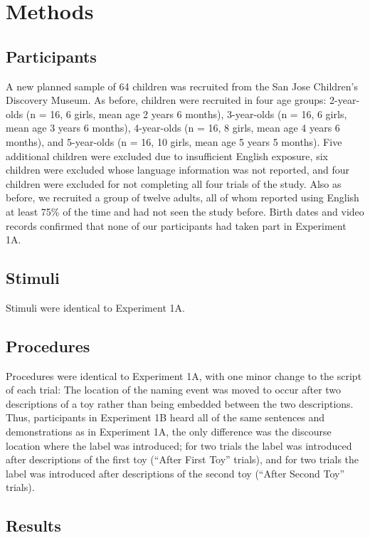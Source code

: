 \documentclass[man]{apa2}
\begin{document}
\section{Methods}

\subsection{Participants}

A new planned sample of 64 children was recruited from the San Jose Children's Discovery Museum. As before, children were recruited in four age groups: 2-year-olds (n = 16, 6 girls, mean age 2 years 6 months), 3-year-olds  (n = 16, 6 girls, mean age 3 years 6 months), 4-year-olds (n = 16, 8 girls, mean age 4 years 6 months), and 5-year-olds (n = 16, 10 girls, mean age 5 years 5 months).  Five additional children were excluded due to insufficient English exposure, six children were excluded whose language information was not reported, and four children were excluded for not completing all four trials of the study.  Also as before, we recruited a group of twelve adults, all of whom reported using English at least 75\% of the time and had not seen the study before.  Birth dates and video records confirmed that none of our participants had taken part in Experiment 1A. 

\subsection{Stimuli}

Stimuli were identical to Experiment 1A. 

\subsection{Procedures}

Procedures were identical to Experiment 1A, with one minor change to the script of each trial: The location of the naming event was moved to occur after two descriptions of a toy rather than being embedded between the two descriptions. Thus, participants in Experiment 1B heard all of the same sentences and demonstrations as in Experiment 1A, the only difference was the discourse location where the label was introduced; for two trials the label was introduced after descriptions of the first toy (``After First Toy'' trials), and for two trials the label was introduced after descriptions of the second toy (``After Second Toy'' trials).  

\subsection{Results}
\end{document}

